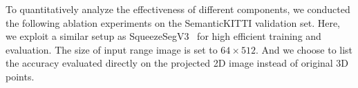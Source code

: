\documentclass{article}
\begin{document}
\begin{table} [t] \tiny
\centering
	\caption{Impact of kenel size on time of model inference}
	\label{tab:speed}
	\vspace{-5mm}
\end{table}

\label{sec:abla}
To quantitatively analyze the effectiveness of different components, we conducted the following ablation experiments on the SemanticKITTI validation set. Here, we exploit a similar setup as SqueezeSegV3~\cite{xu2020squeezesegv3} for high efficient training and evaluation. The size of input range image is set to $64 \times 512$. And we choose to list the accuracy evaluated directly on the projected 2D image instead of original 3D points.
\end{document}
